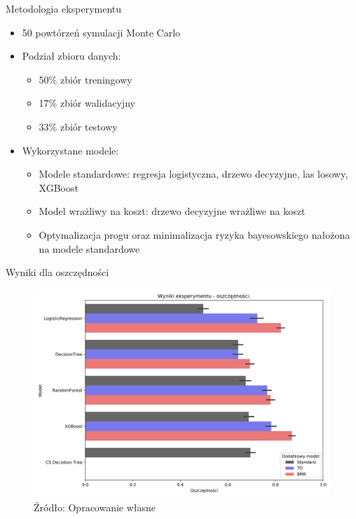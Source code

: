 \documentclass{beamer}
\begin{document}
\begin{frame}{Metodologia eksperymentu}
	\begin{itemize}
		\item 50 powtórzeń symulacji Monte Carlo 
		\item Podział zbioru danych:
		\begin{itemize}
			\item 50\% zbiór treningowy
			\item 17\% zbiór walidacyjny
			\item 33\% zbiór testowy
		\end{itemize}
		\item Wykorzystane modele:
		\begin{itemize}
			\item Modele standardowe: regresja logistyczna, drzewo decyzyjne, las losowy, XGBoost
			\item Model wrażliwy na koszt: drzewo decyzyjne wrażliwe na koszt
			\item Optymalizacja progu oraz minimalizacja ryzyka bayesowskiego nałożona na modele standardowe
		\end{itemize}
	\end{itemize}
\end{frame}

\begin{frame}{Wyniki dla oszczędności}
	\begin{figure}
		\includegraphics[width=0.8\linewidth]{images/100_config1-Savings.png}
		\caption{Źródło: Opracowanie własne}
	\end{figure}
\end{frame}
\end{document}
